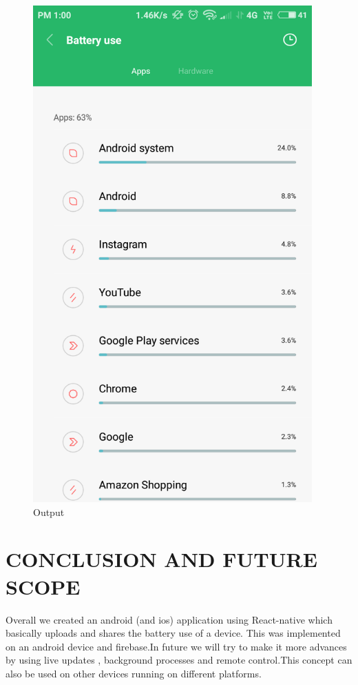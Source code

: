 \begin{figure}[!h]
\centering
\includegraphics[height=7.5in]{out.PNG}
\caption{Output{\tiny }}
  
\end{figure}


\newpage


\chapter{CONCLUSION AND FUTURE SCOPE}

Overall we created an android (and ios) application using React-native which basically uploads and shares the battery use of a device. This was implemented on an android device and firebase.In future we will try to make it more advances by using live updates , background processes and remote control.This concept can also be used on other devices running on different platforms.



